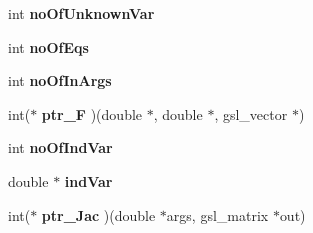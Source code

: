 \begin{DoxyCompactItemize}
\item 
\hypertarget{class_nonlinear_solver_a9cf9e79c131d8c2be66dea927ef12e36}{
int {\bfseries noOfUnknownVar}}
\label{class_nonlinear_solver_a9cf9e79c131d8c2be66dea927ef12e36}

\item 
\hypertarget{class_nonlinear_solver_ab3a2a023d3b6eeda51b8a94d264c593e}{
int {\bfseries noOfEqs}}
\label{class_nonlinear_solver_ab3a2a023d3b6eeda51b8a94d264c593e}

\item 
\hypertarget{class_nonlinear_solver_a81401117c357c6644bc895dc99541cbd}{
int {\bfseries noOfInArgs}}
\label{class_nonlinear_solver_a81401117c357c6644bc895dc99541cbd}

\item 
\hypertarget{class_nonlinear_solver_a9aceef08ce74ef21a22caf7b056a1879}{
int($\ast$ {\bfseries ptr\_\-F} )(double $\ast$, double $\ast$, gsl\_\-vector $\ast$)}
\label{class_nonlinear_solver_a9aceef08ce74ef21a22caf7b056a1879}

\item 
\hypertarget{class_nonlinear_solver_afbbef31be99e0599b2e2f683cdd33a7a}{
int {\bfseries noOfIndVar}}
\label{class_nonlinear_solver_afbbef31be99e0599b2e2f683cdd33a7a}

\item 
\hypertarget{class_nonlinear_solver_a01af1c10fa4653752603d742ff568b3e}{
double $\ast$ {\bfseries indVar}}
\label{class_nonlinear_solver_a01af1c10fa4653752603d742ff568b3e}

\item 
\hypertarget{class_nonlinear_solver_a6ec00b66d80a98dffb992724aceb7cf1}{
int($\ast$ {\bfseries ptr\_\-Jac} )(double $\ast$args, gsl\_\-matrix $\ast$out)}
\label{class_nonlinear_solver_a6ec00b66d80a98dffb992724aceb7cf1}

\end{DoxyCompactItemize}
